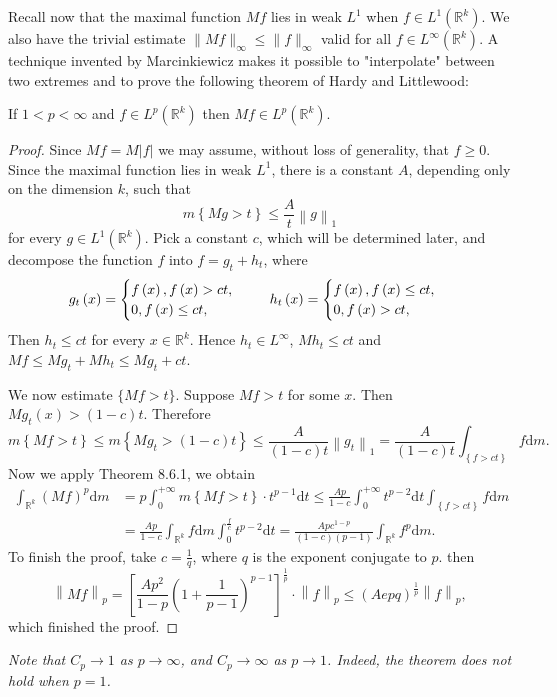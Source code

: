 Recall now that the maximal function $Mf$ lies in weak $L^1$ when $f\in L^1(\mathbb{R}^k)$. We also have the trivial estimate $\|Mf\|_\infty\le\|f\|_\infty$ valid for all $f\in L^\infty(\mathbb{R}^k)$. A technique invented by Marcinkiewicz makes it possible to "interpolate" between two extremes and to prove the following theorem of Hardy and Littlewood: 
\begin{theorem}
If $1<p<\infty$ and $f\in L^p(\mathbb{R}^k)$ then $Mf\in L^p(\mathbb{R}^k)$.
\end{theorem}
\begin{proof}
Since $Mf=M|f|$ we may assume, without loss of generality, that $f\ge 0$. Since the maximal function lies in weak $L^1$, there is a constant $A$, depending only on the dimension $k$, such that 
$$
m\left\{ Mg>t \right\} \le \frac{A}{t}\left\| g \right\| _1
$$
for every $g\in L^1(\mathbb{R}^k)$. Pick a constant $c$, which will be determined later, and decompose the function $f$ into $f=g_t+h_t$, where 
$$
g_t\left( x \right) =\begin{cases}
	f\left( x \right) ,f\left( x \right) >ct,\\
	0,f\left( x \right) \le ct,\\
\end{cases}\hspace{0.5cm}h_t\left( x \right) =\begin{cases}
	f\left( x \right) ,f\left( x \right) \le ct,\\
	0,f\left( x \right) >ct,\\
\end{cases}
$$
Then $h_t\le ct$ for every $x\in\mathbb{R}^k$. Hence $h_t\in L^\infty$, $Mh_t\le ct$ and $Mf\le Mg_t+Mh_t\le Mg_t+ct$.\par
We now estimate $\{Mf>t\}$. Suppose $Mf>t$ for some $x$. Then $Mg_t(x)>(1-c)t$. Therefore 
$$
m\left\{ Mf>t \right\} \le m\left\{ Mg_t>\left( 1-c \right) t \right\} \le \frac{A}{\left( 1-c \right) t}\left\| g_t \right\| _1=\frac{A}{\left( 1-c \right) t}\int_{\left\{ f>ct \right\}}{f\mathrm{d}m}.
$$
Now we apply Theorem 8.6.1, we obtain 
$$
\begin{aligned}
\int_{\mathbb{R} ^k}{\left( Mf \right) ^p\mathrm{d}m}&=p\int_0^{+\infty}{m\left\{ Mf>t \right\} \cdot t^{p-1}\mathrm{d}t}\le \frac{Ap}{1-c}\int_0^{+\infty}{t^{p-2}\mathrm{d}t\int_{\left\{ f>ct \right\}}{f\mathrm{d}m}}
\\
&=\frac{Ap}{1-c}\int_{\mathbb{R} ^k}{f\mathrm{d}m\int_0^{\frac{f}{c}}{t^{p-2}\mathrm{d}t}}=\frac{Apc^{1-p}}{\left( 1-c \right) \left( p-1 \right)}\int_{\mathbb{R} ^k}{f^p\mathrm{d}m}.
\end{aligned}
$$
To finish the proof, take $c=\frac{1}{q}$, where $q$ is the exponent conjugate  to $p$. then 
$$
\left\| Mf \right\| _p=\left[ \frac{Ap^2}{1-p}\left( 1+\frac{1}{p-1} \right) ^{p-1} \right] ^{\frac{1}{p}}\cdot \left\| f \right\| _p\le \left( Aepq \right) ^{\frac{1}{p}}\left\| f \right\| _p,
$$
which finished the proof.
\end{proof}
\begin{note}\em
Note that $C_p\to 1$ as $p\to\infty$, and $C_p\to\infty$ as $p\to 1$. Indeed, the theorem does not hold when $p=1$.
\end{note}
